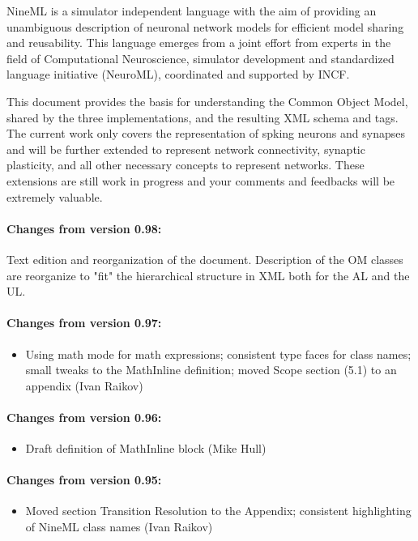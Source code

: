\documentclass{article}
\begin{document}
\newpage
\pagestyle{plain}

\newpage

\abstract
NineML is a simulator independent language with the aim of providing an unambiguous description of neuronal network models for efficient model sharing and reusability. This language emerges from a joint effort from experts in the field of Computational Neuroscience, simulator development and standardized language initiative (NeuroML), coordinated and supported by INCF. 

This document provides the basis for understanding the Common Object Model, shared by the three  implementations, and the resulting XML schema and tags. The current work only covers the representation of spking neurons and synapses and will be further extended to represent network connectivity, synaptic plasticity, and all other necessary concepts to represent networks. 
These extensions are still work in progress and your comments and feedbacks will be extremely valuable.

\newpage
\tableofcontents

\newpage
\vskip 1in
\paragraph{Changes from version 0.98:}
Text edition and reorganization of the document. 
Description of the OM classes are reorganize to "fit" the hierarchical structure in XML both for the AL and the UL.


\paragraph{Changes from version 0.97:}
\begin{itemize}
\item Using math mode for math expressions; consistent type faces for
  class names; small tweaks to the MathInline definition; moved Scope
  section (5.1) to an appendix (Ivan Raikov)
\end{itemize}

\paragraph{Changes from version 0.96:}
\begin{itemize}
\item Draft definition of MathInline block (Mike Hull)
\end{itemize}

\paragraph{Changes from version 0.95:}
\begin{itemize}
\item Moved section Transition Resolution to the Appendix; consistent
  highlighting of NineML class names (Ivan Raikov)
\end{itemize}
\end{document}

